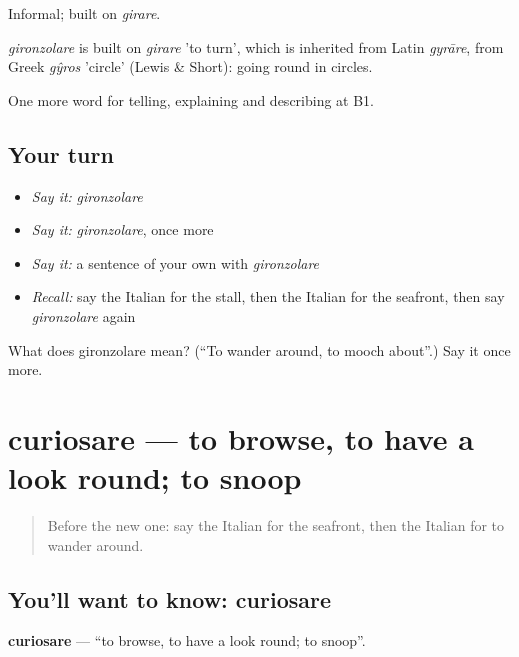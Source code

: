 Informal; built on \emph{girare}.

\begin{cousinweb}
\emph{gironzolare} is built on \emph{girare} 'to turn', which is inherited from Latin \emph{gyrāre}, from Greek \emph{gŷros} 'circle' (Lewis \& Short): going round in circles.
\end{cousinweb}

\begin{grammarlens}[title={What you've built}]
One more word for telling, explaining and describing at B1.
\end{grammarlens}

\subsection*{Your turn}
\begin{itemize}
\raggedright
  \item \emph{Say it:} \emph{gironzolare}
  \item \emph{Say it:} \emph{gironzolare}, once more
  \item \emph{Say it:} a sentence of your own with \emph{gironzolare}
  \item \emph{Recall:} say the Italian for the stall, then the Italian for the seafront, then say \emph{gironzolare} again
\end{itemize}

\begin{tcolorbox}[breakable,colback=teal!4,colframe=teal!35!black,title={Before you move on}]
What does gironzolare mean? (\textquotedblleft{}To wander around, to mooch about\textquotedblright{}.) Say it once more.
\end{tcolorbox}
\section[curiosare]{curiosare — to browse, to have a look round; to snoop}

\label{lesson:IT-C451-curiosare}



\begin{quote}
Before the new one: say the Italian for the seafront, then the Italian for to wander around.
\end{quote}

\subsection*{You'll want to know: curiosare}
\textbf{curiosare} — \textquotedblleft{}to browse, to have a look round; to snoop\textquotedblright{}.

